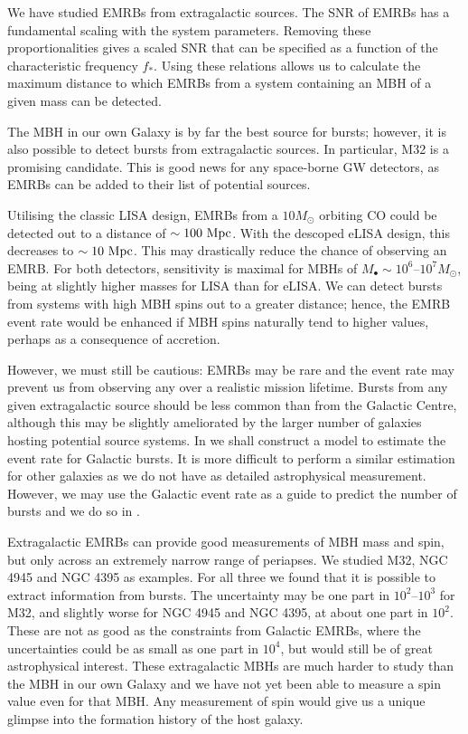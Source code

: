We have studied EMRBs from extragalactic sources. The SNR of EMRBs has a fundamental scaling with the system parameters. Removing these proportionalities gives a scaled SNR that can be specified as a function of the characteristic frequency $f_\ast$. Using these relations allows us to calculate the maximum distance to which EMRBs from a system containing an MBH of a given mass can be detected.

The MBH in our own Galaxy is by far the best source for bursts; however, it is also possible to detect bursts from extragalactic sources. In particular, M32 is a promising candidate. This is good news for any space-borne GW detectors, as EMRBs can be added to their list of potential sources.

Utilising the classic LISA design, EMRBs from a $10 M_\odot$ orbiting CO could be detected out to a distance of $\sim 100~\mathrm{Mpc}$. With the descoped eLISA design, this decreases to $\sim 10~\mathrm{Mpc}$. This may drastically reduce the chance of observing an EMRB. For both detectors, sensitivity is maximal for MBHs of $M_\bullet \sim 10^6$--$10^7 M_\odot$, being at slightly higher masses for LISA than for eLISA. We can detect bursts from systems with high MBH spins out to a greater distance; hence, the EMRB event rate would be enhanced if MBH spins naturally tend to higher values, perhaps as a consequence of accretion.

However, we must still be cautious: EMRBs may be rare and the event rate may prevent us from observing any over a realistic mission lifetime. Bursts from any given extragalactic source should be less common than from the Galactic Centre, although this may be slightly ameliorated by the larger number of galaxies hosting potential source systems. In  we shall construct a model to estimate the event rate for Galactic bursts. It is more difficult to perform a similar estimation for other galaxies as we do not have as detailed astrophysical measurement. However, we may use the Galactic event rate as a guide to predict the number of bursts and we do so in .

Extragalactic EMRBs can provide good measurements of MBH mass and spin, but only across an extremely narrow range of periapses. We studied M32, NGC 4945 and NGC 4395 as examples. For all three we found that it is possible to extract information from bursts. The uncertainty may be one part in $10^2$--$10^3$ for M32, and slightly worse for NGC 4945 and NGC 4395, at about one part in $10^2$. These are not as good as the constraints from Galactic EMRBs, where the uncertainties could be as small as one part in $10^4$, but would still be of great astrophysical interest. These extragalactic MBHs are much harder to study than the MBH in our own Galaxy and we have not yet been able to measure a spin value even for that MBH. Any measurement of spin would give us a unique glimpse into the formation history of the host galaxy.

